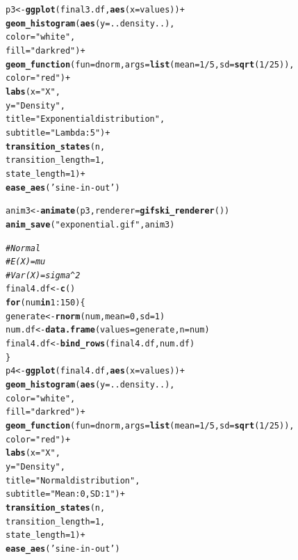 \documentclass{article}\usepackage[]{graphicx}\usepackage[]{color}
\makeatletter
\newcommand{\hlnum}[1]{\textcolor[rgb]{0.686,0.059,0.569}{#1}}%
\newcommand{\hlstr}[1]{\textcolor[rgb]{0.192,0.494,0.8}{#1}}%
\newcommand{\hlcom}[1]{\textcolor[rgb]{0.678,0.584,0.686}{\textit{#1}}}%
\newcommand{\hlopt}[1]{\textcolor[rgb]{0,0,0}{#1}}%
\newcommand{\hlstd}[1]{\textcolor[rgb]{0.345,0.345,0.345}{#1}}%
\newcommand{\hlkwa}[1]{\textcolor[rgb]{0.161,0.373,0.58}{\textbf{#1}}}%
\newcommand{\hlkwb}[1]{\textcolor[rgb]{0.69,0.353,0.396}{#1}}%
\newcommand{\hlkwc}[1]{\textcolor[rgb]{0.333,0.667,0.333}{#1}}%
\newcommand{\hlkwd}[1]{\textcolor[rgb]{0.737,0.353,0.396}{\textbf{#1}}}%
\newenvironment{kframe}{%
 \def\at@end@of@kframe{}%
 \ifinner\ifhmode%
  \def\at@end@of@kframe{\end{minipage}}%
  \begin{minipage}{\columnwidth}%
 \fi\fi%
 \def\FrameCommand##1{\hskip\@totalleftmargin \hskip-\fboxsep
 \colorbox{shadecolor}{##1}\hskip-\fboxsep
     \hskip-\linewidth \hskip-\@totalleftmargin \hskip\columnwidth}%
 \MakeFramed {\advance\hsize-\width
   \@totalleftmargin\z@ \linewidth\hsize
   \@setminipage}}%
 {\par\unskip\endMakeFramed%
 \at@end@of@kframe}
\newenvironment{knitrout}{}{} %
\makeatother
\begin{document}
\begin{knitrout}
\begin{kframe}
\begin{alltt}
\hlstd{p3}\hlkwb{<-}\hlkwd{ggplot}\hlstd{(final3.df,} \hlkwd{aes}\hlstd{(}\hlkwc{x}\hlstd{=values))}\hlopt{+}
  \hlkwd{geom_histogram}\hlstd{(}\hlkwd{aes}\hlstd{(}\hlkwc{y}\hlstd{=..density..),}
                 \hlkwc{color}\hlstd{=}\hlstr{"white"}\hlstd{,}
                 \hlkwc{fill}\hlstd{=}\hlstr{"dark red"}\hlstd{)}\hlopt{+}
  \hlkwd{geom_function}\hlstd{(}\hlkwc{fun}\hlstd{=dnorm,} \hlkwc{args}\hlstd{=}\hlkwd{list}\hlstd{(}\hlkwc{mean}\hlstd{=}\hlnum{1}\hlopt{/}\hlnum{5}\hlstd{,} \hlkwc{sd}\hlstd{=}\hlkwd{sqrt}\hlstd{(}\hlnum{1}\hlopt{/}\hlnum{25}\hlstd{)),}
                \hlkwc{color}\hlstd{=}\hlstr{"red"}\hlstd{)}\hlopt{+}
  \hlkwd{labs}\hlstd{(}\hlkwc{x}\hlstd{=}\hlstr{"X"}\hlstd{,}
       \hlkwc{y}\hlstd{=}\hlstr{"Density"}\hlstd{,}
       \hlkwc{title}\hlstd{=}\hlstr{"Exponential distribution"}\hlstd{,}
       \hlkwc{subtitle}\hlstd{=}\hlstr{"Lambda: 5"}\hlstd{)}\hlopt{+}
\hlkwd{transition_states}\hlstd{(n,}
                    \hlkwc{transition_length} \hlstd{=} \hlnum{1}\hlstd{,}
                    \hlkwc{state_length} \hlstd{=} \hlnum{1}\hlstd{)}\hlopt{+}
  \hlkwd{ease_aes}\hlstd{(}\hlstr{'sine-in-out'}\hlstd{)}

\hlstd{anim3} \hlkwb{<-} \hlkwd{animate}\hlstd{(p3,} \hlkwc{renderer} \hlstd{=} \hlkwd{gifski_renderer}\hlstd{())}
\hlkwd{anim_save}\hlstd{(}\hlstr{"exponential.gif"}\hlstd{, anim3)}

\hlcom{#Normal}
\hlcom{#E(X)=mu}
\hlcom{#Var(X)=sigma^2}
\hlstd{final4.df} \hlkwb{<-} \hlkwd{c}\hlstd{()}
\hlkwa{for}\hlstd{(num} \hlkwa{in} \hlnum{1}\hlopt{:}\hlnum{150}\hlstd{)\{}
  \hlstd{generate} \hlkwb{<-} \hlkwd{rnorm}\hlstd{(num,} \hlkwc{mean}\hlstd{=}\hlnum{0}\hlstd{,} \hlkwc{sd}\hlstd{=}\hlnum{1}\hlstd{)}
  \hlstd{num.df} \hlkwb{<-} \hlkwd{data.frame}\hlstd{(}\hlkwc{values}\hlstd{=generate,} \hlkwc{n}\hlstd{=num)}
  \hlstd{final4.df}\hlkwb{<-}\hlkwd{bind_rows}\hlstd{(final4.df, num.df)}
\hlstd{\}}
\hlstd{p4}\hlkwb{<-}\hlkwd{ggplot}\hlstd{(final4.df,} \hlkwd{aes}\hlstd{(}\hlkwc{x}\hlstd{=values))}\hlopt{+}
  \hlkwd{geom_histogram}\hlstd{(}\hlkwd{aes}\hlstd{(}\hlkwc{y}\hlstd{=..density..),}
                 \hlkwc{color}\hlstd{=}\hlstr{"white"}\hlstd{,}
                 \hlkwc{fill}\hlstd{=}\hlstr{"dark red"}\hlstd{)}\hlopt{+}
  \hlkwd{geom_function}\hlstd{(}\hlkwc{fun}\hlstd{=dnorm,} \hlkwc{args}\hlstd{=}\hlkwd{list}\hlstd{(}\hlkwc{mean}\hlstd{=}\hlnum{1}\hlopt{/}\hlnum{5}\hlstd{,} \hlkwc{sd}\hlstd{=}\hlkwd{sqrt}\hlstd{(}\hlnum{1}\hlopt{/}\hlnum{25}\hlstd{)),}
                \hlkwc{color}\hlstd{=}\hlstr{"red"}\hlstd{)}\hlopt{+}
  \hlkwd{labs}\hlstd{(}\hlkwc{x}\hlstd{=}\hlstr{"X"}\hlstd{,}
       \hlkwc{y}\hlstd{=}\hlstr{"Density"}\hlstd{,}
       \hlkwc{title}\hlstd{=}\hlstr{"Normal distribution"}\hlstd{,}
       \hlkwc{subtitle}\hlstd{=}\hlstr{"Mean: 0, SD: 1"}\hlstd{)}\hlopt{+}
  \hlkwd{transition_states}\hlstd{(n,}
                    \hlkwc{transition_length} \hlstd{=} \hlnum{1}\hlstd{,}
                    \hlkwc{state_length} \hlstd{=} \hlnum{1}\hlstd{)}\hlopt{+}
  \hlkwd{ease_aes}\hlstd{(}\hlstr{'sine-in-out'}\hlstd{)}


\end{alltt}
\end{kframe}
\end{knitrout}
\end{document}
